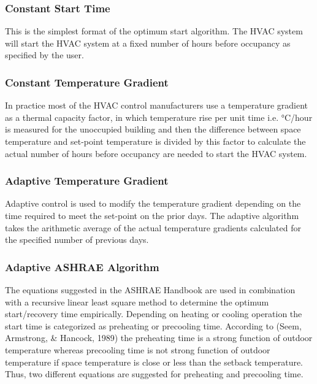 \subsubsection{Constant Start Time}\label{constant-start-time}

This is the simplest format of the optimum start algorithm. The HVAC system will start the HVAC system at a fixed number of hours before occupancy as specified by the user.

\subsubsection{Constant Temperature Gradient}\label{constant-temperature-gradient}

In practice most of the HVAC control manufacturers use a temperature gradient as a thermal capacity factor, in which temperature rise per unit time i.e. °C/hour is measured for the unoccupied building and then the difference between space temperature and set-point temperature is divided by this factor to calculate the actual number of hours before occupancy are needed to start the HVAC system.

\subsubsection{Adaptive Temperature Gradient}\label{adaptive-temperature-gradient}

Adaptive control is used to modify the temperature gradient depending on the time required to meet the set-point on the prior days. The adaptive algorithm takes the arithmetic average of the actual temperature gradients calculated for the specified number of previous days.

\subsubsection{Adaptive ASHRAE Algorithm}\label{adaptive-ashrae-algorithm}

The equations suggested in the ASHRAE Handbook are used in combination with a recursive linear least square method to determine the optimum start/recovery time empirically. Depending on heating or cooling operation the start time is categorized as preheating or precooling time. According to (Seem, Armstrong, \& Hancock, 1989) the preheating time is a strong function of outdoor temperature whereas precooling time is not strong function of outdoor temperature if space temperature is close or less than the setback temperature. Thus, two different equations are suggested for preheating and precooling time.

